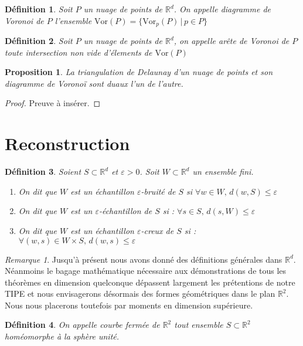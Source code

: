 \documentclass{report}
\newcommand{\R}{\mathbb{R}}
\newcommand{\Vor}{\mathrm{Vor}}
\newcommand{\eps}{\varepsilon}
\newtheorem{definition}{Définition}
\newtheorem{prop}{Proposition}
\theoremstyle{remark}
\newtheorem*{rmq}{Remarque}
\begin{document}
\begin{definition}
	Soit $P$ un nuage de points de $\R^d$. On appelle \textnormal{diagramme de Voronoi} de $P$ l'ensemble $\Vor(P) = \{\Vor_p(P)\,|\,p\in P\}$
\end{definition}

\begin{definition}
	Soit $P$ un nuage de points de $\R^d$, on appelle \textnormal{arête de Voronoi} de $P$ toute intersection non vide d'élements de $\Vor(P)$
\end{definition}

\begin{prop}
	La triangulation de Delaunay d'un nuage de points et son diagramme de Voronoï sont duaux l'un de l'autre.
\end{prop}

\begin{proof}
	Preuve à insérer.
\end{proof}

\section{Reconstruction}
\begin{definition}
	 Soient $S \subset \R^d$ et $\eps>0$. Soit $W\subset \R^d$ un ensemble fini.
	\begin{enumerate}
	\item On dit que $W$ est un échantillon \textnormal{$\eps$-bruité} de $S$ si $\forall w \in W,\, d(w, S) \leq \eps$
	\item On dit que $W$ est un \textnormal{$\eps$-échantillon} de $S$ si : $\forall s \in S,\, d(s, W) \leq \eps$
	\item On dit que $W$ est un échantillon \textnormal{$\eps$-creux} de $S$ si : $\forall (w, s) \in W\times S,\, d(w, s) \leq \eps$
	\end{enumerate}
\end{definition}

\begin{rmq}
	Jusqu'à présent nous avons donné des définitions générales dans $\R^d$. Néanmoins le bagage mathématique nécessaire aux démonstrations de tous les théorèmes en dimension quelconque dépassent largement les prétentions de notre TIPE et nous envisagerons désormais des formes géométriques dans le plan $\R^2$. Nous nous placerons toutefois par moments en dimension supérieure.
\end{rmq}

\begin{definition}
	On appelle courbe fermée de $\R^2$ tout ensemble $S\subset\R^2$ homéomorphe à la sphère unité.
\end{definition}
\end{document}
